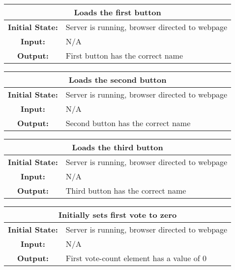 \documentclass[12pt, titlepage]{article}
\begin{document}
\begin{center}
\begin{table}[H]
\begin{tabularx}{\textwidth}{| c X |}
\hline
\multicolumn{2}{|c|}{\textbf{Loads the first button}}\\
\hline
\textbf{Initial State: } & Server is running, browser directed to webpage\\
\textbf{Input: } & N/A\\
\textbf{Output: } & First button has the correct name\\
\hline
\end{tabularx}
\end{table}
\end{center}


\begin{center}
\begin{table}[H]
\begin{tabularx}{\textwidth}{| c X |}
\hline
\multicolumn{2}{|c|}{\textbf{Loads the second button}}\\
\hline
\textbf{Initial State: } & Server is running, browser directed to webpage\\
\textbf{Input: } & N/A\\
\textbf{Output: } & Second button has the correct name\\
\hline
\end{tabularx}
\end{table}
\end{center}


\begin{center}
\begin{table}[H]
\begin{tabularx}{\textwidth}{| c X |}
\hline
\multicolumn{2}{|c|}{\textbf{Loads the third button}}\\
\hline
\textbf{Initial State: } & Server is running, browser directed to webpage\\
\textbf{Input: } & N/A\\
\textbf{Output: } & Third button has the correct name\\
\hline
\end{tabularx}
\end{table}
\end{center}


\begin{center}
\begin{table}[H]
\begin{tabularx}{\textwidth}{| c X |}
\hline
\multicolumn{2}{|c|}{\textbf{Initially sets first vote to zero}}\\
\hline
\textbf{Initial State: } & Server is running, browser directed to webpage\\
\textbf{Input: } & N/A\\
\textbf{Output: } & First vote-count element has a value of 0\\
\hline
\end{tabularx}
\end{table}
\end{center}
\end{document}
